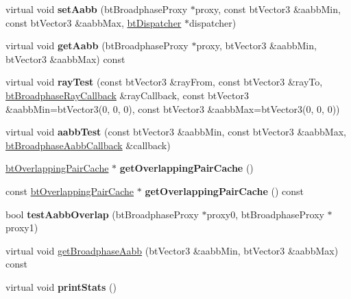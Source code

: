 \begin{DoxyCompactItemize}
\item 
\hypertarget{classbt_simple_broadphase_a66c0d10165376dd63cb4b498253caa9a}{virtual void {\bfseries set\+Aabb} (bt\+Broadphase\+Proxy $\ast$proxy, const bt\+Vector3 \&aabb\+Min, const bt\+Vector3 \&aabb\+Max, \hyperlink{classbt_dispatcher}{bt\+Dispatcher} $\ast$dispatcher)}\label{classbt_simple_broadphase_a66c0d10165376dd63cb4b498253caa9a}

\item 
\hypertarget{classbt_simple_broadphase_a700afc87f6c970c641e59fb0de5fa254}{virtual void {\bfseries get\+Aabb} (bt\+Broadphase\+Proxy $\ast$proxy, bt\+Vector3 \&aabb\+Min, bt\+Vector3 \&aabb\+Max) const }\label{classbt_simple_broadphase_a700afc87f6c970c641e59fb0de5fa254}

\item 
\hypertarget{classbt_simple_broadphase_a1ceb9e591e39dcd013209f9b7d02c459}{virtual void {\bfseries ray\+Test} (const bt\+Vector3 \&ray\+From, const bt\+Vector3 \&ray\+To, \hyperlink{structbt_broadphase_ray_callback}{bt\+Broadphase\+Ray\+Callback} \&ray\+Callback, const bt\+Vector3 \&aabb\+Min=bt\+Vector3(0, 0, 0), const bt\+Vector3 \&aabb\+Max=bt\+Vector3(0, 0, 0))}\label{classbt_simple_broadphase_a1ceb9e591e39dcd013209f9b7d02c459}

\item 
\hypertarget{classbt_simple_broadphase_a1877ed249a848ec50705b61f52cdde9f}{virtual void {\bfseries aabb\+Test} (const bt\+Vector3 \&aabb\+Min, const bt\+Vector3 \&aabb\+Max, \hyperlink{structbt_broadphase_aabb_callback}{bt\+Broadphase\+Aabb\+Callback} \&callback)}\label{classbt_simple_broadphase_a1877ed249a848ec50705b61f52cdde9f}

\item 
\hypertarget{classbt_simple_broadphase_a66ea1c78dbf926e744716ca547cef831}{\hyperlink{classbt_overlapping_pair_cache}{bt\+Overlapping\+Pair\+Cache} $\ast$ {\bfseries get\+Overlapping\+Pair\+Cache} ()}\label{classbt_simple_broadphase_a66ea1c78dbf926e744716ca547cef831}

\item 
\hypertarget{classbt_simple_broadphase_aaf70de9db87dc811adcd5958e0eabf43}{const \hyperlink{classbt_overlapping_pair_cache}{bt\+Overlapping\+Pair\+Cache} $\ast$ {\bfseries get\+Overlapping\+Pair\+Cache} () const }\label{classbt_simple_broadphase_aaf70de9db87dc811adcd5958e0eabf43}

\item 
\hypertarget{classbt_simple_broadphase_a377a57ae8d343194a75ac51d4e3c005a}{bool {\bfseries test\+Aabb\+Overlap} (bt\+Broadphase\+Proxy $\ast$proxy0, bt\+Broadphase\+Proxy $\ast$proxy1)}\label{classbt_simple_broadphase_a377a57ae8d343194a75ac51d4e3c005a}

\item 
virtual void \hyperlink{classbt_simple_broadphase_a8753363773ebbfeb48f8cf5594429dc2}{get\+Broadphase\+Aabb} (bt\+Vector3 \&aabb\+Min, bt\+Vector3 \&aabb\+Max) const 
\item 
\hypertarget{classbt_simple_broadphase_aa2697c7a6883ae3192ea1eeb64ded59c}{virtual void {\bfseries print\+Stats} ()}\label{classbt_simple_broadphase_aa2697c7a6883ae3192ea1eeb64ded59c}

\end{DoxyCompactItemize}
